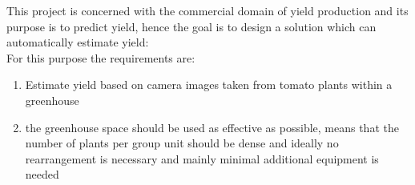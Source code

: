 This project is concerned with the commercial domain of yield production and its purpose
is to predict yield, hence the goal is to design a solution which can automatically estimate yield:\\

For this purpose the requirements are:

\begin{enumerate}
    \item Estimate yield based on camera images taken from tomato plants within a greenhouse
    \item the greenhouse space should be used as effective as possible, means that the number of plants per group unit should be dense
    and ideally no rearrangement is necessary and mainly minimal additional equipment is needed
\end{enumerate}
\newpage
